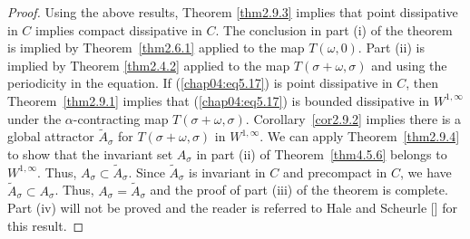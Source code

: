 \documentclass{surv-l}
\theoremstyle{plain}
\theoremstyle{definition}
\numberwithin{equation}{section}
\numberwithin{figure}{chapter}
\begin{document}
\begin{proof}
Using the above results, Theorem \ref{thm2.9.3} implies that point dissipative in $C$ implies compact dissipative in $C$. The conclusion in part (i) of the theorem is implied by Theorem~\ref{thm2.6.1} applied to the map $T(\omega, 0)$. Part (ii) is implied by Theorem \ref{thm2.4.2} applied to the map $T(\sigma+\omega, \sigma)$ and using the periodicity in the equation. If (\ref{chap04:eq5.17}) is point dissipative in $C$, then Theorem~\ref{thm2.9.1} implies that (\ref{chap04:eq5.17}) is bounded dissipative in $W^{1,\infty}$ under the $\alpha$-contracting map $T(\sigma+\omega, \sigma)$. Corollary~\ref{cor2.9.2} implies there is a global attractor $\tilde{A}_{\sigma}$ for $T(\sigma+\omega, \sigma)$ in $W^{1,\infty}$. We can apply Theorem~\ref{thm2.9.4} to show that the invariant set $A_{\sigma}$ in part (ii) of Theorem~\ref{thm4.5.6} belongs to $W^{1,\infty}$. Thus, $A_{\sigma}\subset\tilde{A}_{\sigma}$. Since $\tilde{A}_{\sigma}$ is invariant in $C$ and precompact in $C$, we have $\tilde{A}_{\sigma}\subset A_{\sigma}$. Thus, $A_{\sigma}=\tilde{A}_{\sigma}$ and the proof of part (iii) of the theorem is complete. Part (iv) will not be proved and the reader is referred to Hale and Scheurle [\citeyear{1985hs}] for this result.
\end{proof}
\end{document}
